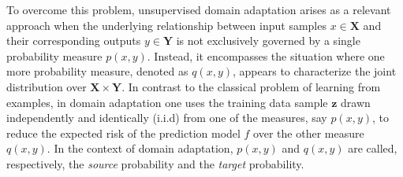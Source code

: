\documentclass[USenglish]{article}
\newcommand{\bz}{\mathbf{z}}
\begin{document}
To overcome this problem, unsupervised domain adaptation arises as a relevant approach when the underlying relationship between input samples $x \in \mathbf{X}$ and their corresponding outputs $y \in \mathbf{Y}$ is not exclusively governed by a single probability measure $p(x,y)$.  Instead, it encompasses the situation where %
one more probability measure, denoted as $q(x,y)$, appears to characterize the joint distribution over $\mathbf{X} \times \mathbf{Y}$. 
In contrast to the classical problem of learning from examples, in domain adaptation one uses the training data sample $\bz$ drawn independently and identically (i.i.d) from one of the measures, say $p(x,y)$, to reduce the expected risk of the prediction model $f$ over the other measure $q(x,y)$. In the context of domain adaptation, $p(x,y)$ and $q(x,y)$ are called, respectively, the \textit{source} probability and the \textit{target} probability.
\end{document}
